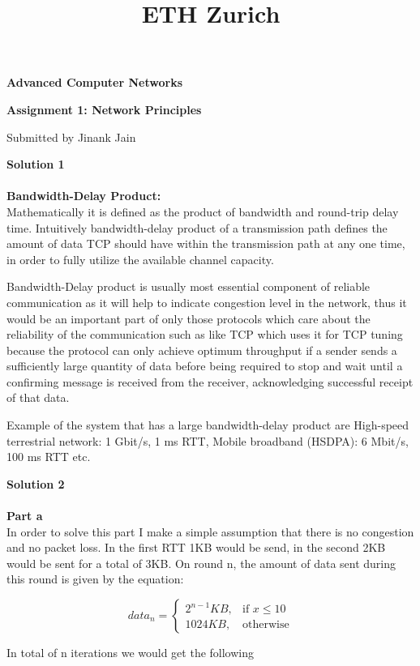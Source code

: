 \documentclass[letterpaper, 11pt]{article}
\title{ETH Zurich}
\begin{document}

\begin{center}
\Large \bf Advanced Computer Networks

\Large \bf Assignment 1: Network Principles

\large Submitted by Jinank Jain
\end{center}

\textbf{Solution 1}\\ \\
\textbf{Bandwidth-Delay Product:} \\
Mathematically it is defined as the product of bandwidth and round-trip delay time. Intuitively bandwidth-delay product of a transmission path defines the amount of data TCP should have within the transmission path at any one time, in order to fully utilize the available channel capacity.

Bandwidth-Delay product is usually most essential component of reliable communication as it will help to indicate congestion level in the network, thus it would be an important part of only those protocols which care about the reliability of the communication such as like TCP which uses it for TCP tuning because the protocol can only achieve optimum throughput if a sender sends a sufficiently large quantity of data before being required to stop and wait until a confirming message is received from the receiver, acknowledging successful receipt of that data.

Example of the system that has a large bandwidth-delay product are High-speed terrestrial network: 1 Gbit/s, 1 ms RTT, Mobile broadband (HSDPA): 6 Mbit/s, 100 ms RTT etc.

\bigskip

\textbf{Solution 2}\\ \\
\textbf{Part a} \\
In order to solve this part I make a simple assumption that there is no congestion and no packet loss. In the first RTT 1KB would be send, in the second 2KB would be sent for a total of 3KB. On round n, the amount of data sent during this round is given by the equation:

\[
    data_n = 
\begin{cases}
    2^{n-1} KB,& \text{if } x\le 10\\
    1024 KB,              & \text{otherwise}
\end{cases}
\]

In total of n iterations we would get the following
\end{document}
